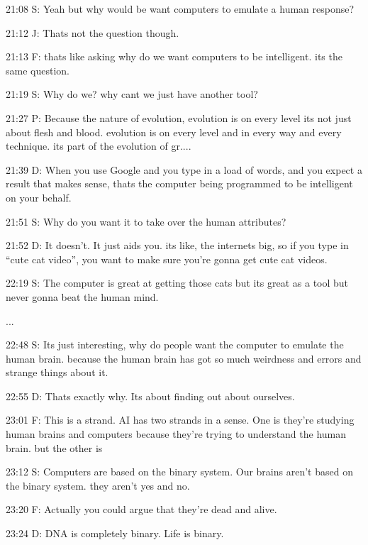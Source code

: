 21:08 S: Yeah but why would be want computers to emulate a human response?

21:12 J: Thats not the question though.

21:13 F: thats like asking why do we want computers to be intelligent. its the same question.

21:19 S: Why do we? why cant we just have another tool?

21:27 P: Because the nature of evolution, evolution is on every level its not just about flesh and blood. evolution is on every level and in every way and every technique. its part of the evolution of gr....

21:39 D: When you use Google and you type in a load of words, and you expect a result that makes sense, thats the computer being programmed to be intelligent on your behalf.

21:51 S: Why do you want it to take over the human attributes?

21:52 D: It doesn't. It just aids you. its like, the internets big, so if you type in ``cute cat video'', you want to make sure you're gonna get cute cat videos.

22:19 S: The computer is great at getting those cats but its great as a tool but never gonna beat the human mind.

...

22:48 S: Its just interesting, why do people want the computer to emulate the human brain. because the human brain has got so much weirdness and errors and strange things about it.

22:55 D: Thats exactly why. Its about finding out about ourselves.

23:01 F: This is a strand. AI has two strands in a sense. One is they're studying human brains and computers because they're trying to understand the human brain. but the other is

23:12 S: Computers are based on the binary system. Our brains aren't based on the binary system. they aren't yes and no.

23:20 F: Actually you could argue that they're dead and alive.

23:24 D: DNA is completely binary. Life is binary.
